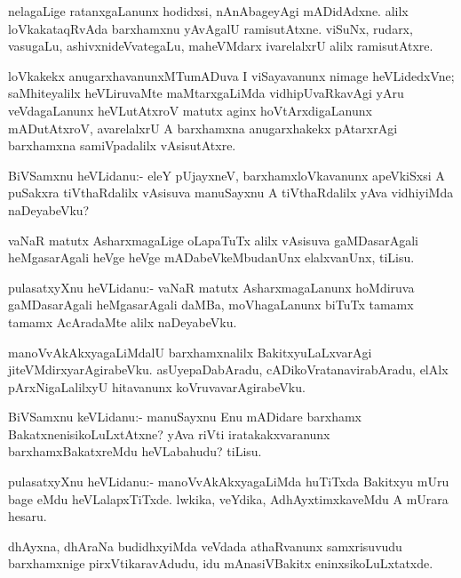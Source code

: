 \documentclass{article}
\begin{document}
\begin{mn}%
nelagaLige ratanxgaLanunx hodidxsi, nAnAbageyAgi mADidAdxne. alilx
loVkakataqRvAda barxhamxnu yAvAgalU ramisutAtxne. viSuNx, rudarx,
vasugaLu, ashivxnideVvategaLu, maheVMdarx ivarelalxrU alilx ramisutAtxre.
\end{mn}

\begin{mn}%
loVkakekx anugarxhavanunxMTumADuva I viSayavanunx nimage heVLidedxVne;
saMhiteyalilx heVLiruvaMte maMtarxgaLiMda vidhipUvaRkavAgi yAru
veVdagaLanunx heVLutAtxroV matutx aginx hoVtArxdigaLanunx mADutAtxroV,
avarelalxrU A barxhamxna anugarxhakekx pAtarxrAgi barxhamxna
samiVpadalilx vAsisutAtxre.
\end{mn}

\begin{mn}
BiVSamxnu heVLidanu:- eleY pUjayxneV, barxhamxloVkavanunx apeVkiSxsi A
puSakxra tiVthaRdalilx vAsisuva manuSayxnu A tiVthaRdalilx yAva
vidhiyiMda naDeyabeVku?
\end{mn}

\begin{mn}
vaNaR matutx AsharxmagaLige oLapaTuTx alilx vAsisuva gaMDasarAgali
heMgasarAgali heVge heVge mADabeVkeMbudanUnx elalxvanUnx, tiLisu.
\end{mn}

\begin{mn}
pulasatxyXnu heVLidanu:- vaNaR matutx AsharxmagaLanunx hoMdiruva
gaMDasarAgali heMgasarAgali daMBa, moVhagaLanunx biTuTx tamamx tamamx
AcAradaMte alilx naDeyabeVku.
\end{mn}

\begin{mn}
manoVvAkAkxyagaLiMdalU barxhamxnalilx BakitxyuLaLxvarAgi
jiteVMdirxyarAgirabeVku. asUyepaDabAradu, cADikoVratanavirabAradu,
elAlx pArxNigaLalilxyU hitavanunx koVruvavarAgirabeVku.
\end{mn}

\begin{mn}
BiVSamxnu keVLidanu:- manuSayxnu Enu mADidare barxhamx
BakatxnenisikoLuLxtAtxne? yAva riVti iratakakxvaranunx
barxhamxBakatxreMdu heVLabahudu? tiLisu.
\end{mn}

\begin{mn}
pulasatxyXnu heVLidanu:- manoVvAkAkxyagaLiMda huTiTxda Bakitxyu mUru
bage eMdu heVLalapxTiTxde. lwkika, veYdika, AdhAyxtimxkaveMdu A mUrara hesaru.
\end{mn}

\begin{mn}
dhAyxna, dhAraNa budidhxyiMda veVdada athaRvanunx samxrisuvudu
barxhamxnige pirxVtikaravAdudu, idu mAnasiVBakitx eninxsikoLuLxtatxde.
\end{mn}
\end{document}
